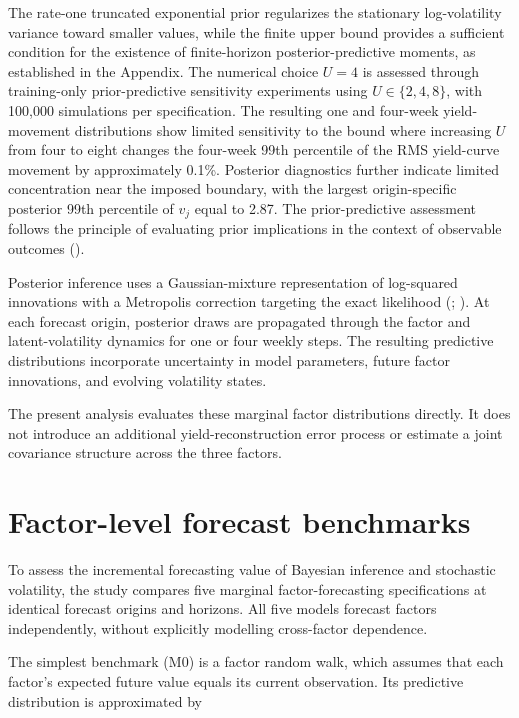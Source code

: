 \documentclass[
  12pt,
  letterpaper,
  DIV=11,
  numbers=noendperiod]{scrreprt}
\begin{document}
The rate-one truncated exponential prior regularizes the stationary
log-volatility variance toward smaller values, while the finite upper
bound provides a sufficient condition for the existence of
finite-horizon posterior-predictive moments, as established in the
Appendix. The numerical choice \(U=4\) is assessed through training-only
prior-predictive sensitivity experiments using \(U\in\{2,4,8\}\), with
100,000 simulations per specification. The resulting one and four-week
yield-movement distributions show limited sensitivity to the bound where
increasing \(U\) from four to eight changes the four-week 99th
percentile of the RMS yield-curve movement by approximately 0.1\%.
Posterior diagnostics further indicate limited concentration near the
imposed boundary, with the largest origin-specific posterior 99th
percentile of \(v_j\) equal to 2.87. The prior-predictive assessment
follows the principle of evaluating prior implications in the context of
observable outcomes ().

Posterior inference uses a Gaussian-mixture representation of
log-squared innovations with a Metropolis correction targeting the exact
likelihood (;
). At each
forecast origin, posterior draws are propagated through the factor and
latent-volatility dynamics for one or four weekly steps. The resulting
predictive distributions incorporate uncertainty in model parameters,
future factor innovations, and evolving volatility states.

The present analysis evaluates these marginal factor distributions
directly. It does not introduce an additional yield-reconstruction error
process or estimate a joint covariance structure across the three
factors.

\section{Factor-level forecast
benchmarks}\label{factor-level-forecast-benchmarks}

To assess the incremental forecasting value of Bayesian inference and
stochastic volatility, the study compares five marginal
factor-forecasting specifications at identical forecast origins and
horizons. All five models forecast factors independently, without
explicitly modelling cross-factor dependence.

The simplest benchmark (M0) is a factor random walk, which assumes that
each factor's expected future value equals its current observation. Its
predictive distribution is approximated by
\end{document}
